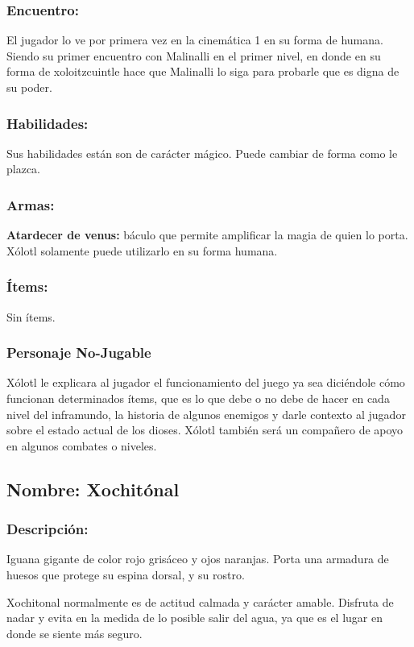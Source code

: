 \documentclass[11pt,letterpaper]{article}
\begin{document}
\subsubsection{Encuentro:}
El jugador lo ve por primera vez en la cinemática 1 en su forma de humana. Siendo su primer encuentro con Malinalli en el primer nivel, en donde en su forma de xoloitzcuintle hace que Malinalli lo siga para probarle que es digna de su poder. 

\subsubsection{Habilidades:}
Sus habilidades están son de carácter mágico. Puede cambiar de forma como le plazca.
\subsubsection{Armas:}
\textbf{Atardecer de venus:} báculo que permite amplificar la magia de quien lo porta. Xólotl solamente puede utilizarlo en su forma humana.
\subsubsection{Ítems:}
Sin ítems.

\subsubsection{Personaje No-Jugable}
Xólotl le explicara al jugador el funcionamiento del juego ya sea diciéndole cómo funcionan determinados ítems, que es lo que debe o no debe de hacer en cada nivel del inframundo, la historia de algunos enemigos y darle contexto al jugador sobre el estado actual de los dioses. Xólotl también será un compañero de apoyo en algunos combates o niveles.

\subsection{Nombre: Xochitónal}  \label{per.xochitonal}

\subsubsection{Descripción:}
Iguana gigante de color rojo grisáceo y ojos naranjas. Porta una armadura de huesos que protege su espina dorsal, y su rostro.
\\
\par
Xochitonal normalmente es de actitud calmada y carácter amable. Disfruta de nadar y evita en la medida de lo posible salir del agua, ya que es el lugar en donde se siente más seguro.  
\end{document}
